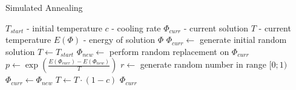 \begin{algorithm}
\caption{Simulated Annealing}\label{euclid}
\begin{algorithmic}[1]
		\State $T_{start}$ - initial temperature
		\State $c$ - cooling rate
		\State $\Phi_{curr}$ - current solution
		\State $T$ - current temperature
		\State $E(\Phi)$ - energy of solution $\Phi$
		\State $\Phi_{curr} \gets$ generate initial random solution
		\State $T \gets T_{start}$
			\State $\Phi_{new} \gets$ perform random replacement on $\Phi_{curr}$
			\State $p \gets \exp(\frac{E(\Phi_{curr})-E(\Phi_{new})}{T})$
			\State $r \gets$ generate random number in range $[0;1)$
				\State $\Phi_{curr} \gets \Phi_{new}$
			\EndIf
			\State $T \gets T \cdot (1 - c)$
		\EndWhile
		\State \Return $\Phi_{curr}$
	\EndProcedure
\end{algorithmic}
\end{algorithm}
